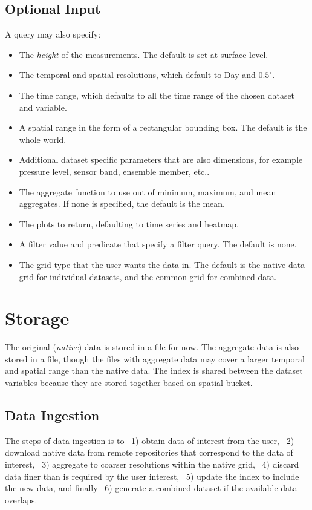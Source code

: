 \subsection{Optional Input}
A query may also specify: 
\begin{itemize}
    \item The \emph{height} of the measurements. The default is set at surface level.
    \item The temporal and spatial resolutions, which default to Day and $0.5^{\circ}$.
    \item The time range, which defaults to all the time range of the chosen dataset and variable.
    \item A spatial range in the form of a rectangular bounding box. The default is the whole world.
    \item Additional dataset specific parameters that are also dimensions, for example pressure level, sensor band, ensemble member, etc..
    \item The aggregate function to use out of minimum, maximum, and mean aggregates. If none is specified, the default is the mean.
    \item The plots to return, defaulting to time series and heatmap.
    \item A filter value and predicate that specify a filter query. The default is none.
    \item The grid type that the user wants the data in. The default is the native data grid for individual datasets, and the common grid for combined data.
\end{itemize}
 
\section{Storage}
The original (\emph{native}) data is stored in a file for now. The aggregate data is also stored in a file, though the files with aggregate data may cover a larger temporal and spatial range than the native data. The index is shared between the dataset variables because they are stored together based on spatial bucket.

\subsection{Data Ingestion}
The steps of data ingestion is to ~1) obtain data of interest from the user, ~2) download native data from remote repositories that correspond to the data of interest, ~3) aggregate to coarser resolutions within the native grid, ~4) discard data finer than is required by the user interest, ~5) update the index to include the new data, and finally ~6) generate a combined dataset if the available data overlaps.

